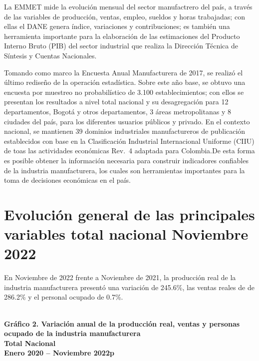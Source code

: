 \documentclass[
]{article}
\begin{document}
La EMMET mide la evolución mensual del sector manufactrero del país, a
través de las variables de producción, ventas, empleo, sueldos y horas
trabajadas; con ellas el DANE genera índice, variaciones y
contribuciones; es también una herramienta importante para la
elaboración de las estimaciones del Producto Interno Bruto (PIB) del
sector industrial que realiza la Dirección Técnica de Síntesis y Cuentas
Nacionales.

Tomando como marco la Encuesta Anual Manufacturera de 2017, se realizó
el último rediseño de la operación estadística. Sobre este año base, se
obtuvo una encuesta por muestreo no probabilístico de 3.100
establecimientos; con ellos se presentan los resultados a nivel total
nacional y su desagregación para 12 departamentos, Bogotá y otros
departamentos, 3 áreas metropolitanas y 8 ciudades del país, para los
diferentes usuarios públicos y privado. En el contexto nacional, se
mantienen 39 dominios industriales manufactureros de publicación
establecidos con base en la Clasificación Industrial Internacional
Uniforme (CIIU) de toas las actividades económicas Rev.~4 adaptada para
Colombia.De esta forma es posible obtener la información necesaria para
construir indicadores confiables de la industria manufacturera, los
cuales son herramientas importantes para la toma de decisiones
económicas en el país.

\hypertarget{evoluciuxf3n-general-de-las-principales-variables-total-nacional-noviembre-2022}{%
\section{Evolución general de las principales variables total nacional
Noviembre
2022}\label{evoluciuxf3n-general-de-las-principales-variables-total-nacional-noviembre-2022}}

En Noviembre de 2022 frente a Noviembre de 2021, la producción real de
la industria manufacturera presentó una variación de 245.6\%, las ventas
reales de de 286.2\% y el personal ocupado de 0.7\%.\\
\strut \\
\textbf{Gráfico 2. Variación anual de la producción real, ventas y personas ocupado de la industria manufacturera}\\
\textbf{Total Nacional}\\
\textbf{Enero 2020 – Noviembre 2022p}\\
\end{document}
